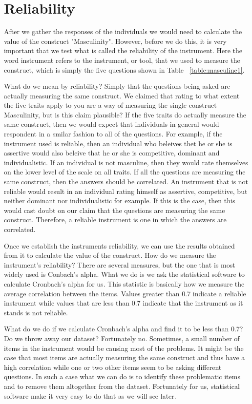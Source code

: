 \documentclass[a4paper,12pt,oneside]{book}
\begin{document}
\section{Reliability}
After we gather the responses of the individuals we would need to calculate the value of the construct "Masculinity". However, before we do this, it
is very important that we test what is called the reliability of the instrument. Here the word instrument refers to the instrument, or tool, that we
used to measure the construct, which is simply the five questions shown in Table ~\ref{table:masculine1}. 

What do we mean by reliability? Simply that the questions being asked are actually measuring the same construct. We claimed that rating to what
extent the five traits apply to you are a way of measuring the single construct Masculinity, but is this claim plausible? If the five traits do
actually measure the same construct, then we would expect that individuals in general would respondent in a smilar fashion to all of the questions.
For example, if the instrument used is reliable, then an individual who beleives thet he or she is assertive would also beleive that he or she is
competitive, dominant and individualistic. If an individual is not masculine, then they would rate themselves on the lower level of the scale on all
traits. If all the questions are measuring the same construct, then the answers should be correlated. An instrument that is not reliable would
result in an individual rating himself as assertive, competitive, but neither dominant nor individualistic for example. If this is the case, then this would 
cast doubt on our claim that the questions are measuring the same construct. Therefore, a reliable instrument is one in which the answers are
correlated. 

Once we establish the instruments reliability, we can use the results obtained from it to calculate the value of the construct. How do we measure
the instrument's reliability? There are several measures, but the one that is most widely used is Conbach's alpha. What we do is we ask the 
statistical software to calculate Cronbach's alpha for us. This statistic is basically how we measure the average correlation between the items.
Values greater than 0.7 indicate a reliable instrument while values that are less than 0.7 indicate that the instrument as it stands is not
reliable.

What do we do if we calculate Cronbach's alpha and find it to be less than 0.7? Do we throw away our dataset? Fortunately no. Sometimes, a small
number of items in the instrument would be causing most of the problems. It might be the case that most items are actually measuring the same
construct and thus have a high correlation while one or two other items seem to be asking different questions. In such a case what we can do
is to identify these problematic items and to remove them altogether from the dataset. Fortunately for us, statistical software make it very
easy to do that as we will see later.
\end{document}
